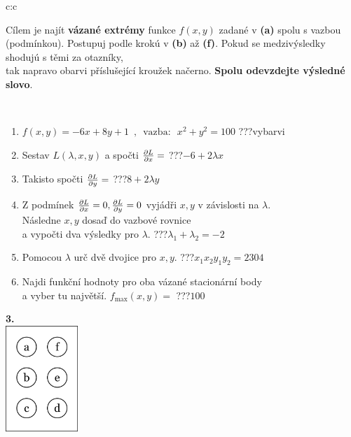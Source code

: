 \documentclass[10pt]{report}
\begin{document}
\begin{tabular}{c:c}
\begin{minipage}[c][104.5mm][t]{0.5\linewidth}
\begin{center}
\begin{minipage}{0.95\linewidth}
\begin{center}
Cílem je najít \textbf{vázané extrémy} funkce $f(x,y)$ zadané v \textbf{(a)} spolu s vazbou (podmínkou). Postupuj podle krokú v \textbf{(b)} až \textbf{(f)}. Pokud se medzivýsledky shodujú s těmi za otazníky,\\tak napravo obarvi příslušející kroužek načerno. \textbf{Spolu odevzdejte výsledné slovo}.
\end{center}
\end{minipage}
\\[1mm]
\begin{minipage}{0.79\linewidth}
\begin{center}
\begin{varwidth}{\linewidth}
\begin{enumerate}
\normalsize
\item $f(x,y)=-6x+8y+1 \enspace , \enspace \mathrm{vazba:} \enspace x^2+y^2=100$\quad \dotfill\; ???\;\dotfill \quad vybarvi
\item Sestav $L(\lambda,x,y)$ a spočti $\pdv{L}{x}=$\quad \dotfill\; ???\;\dotfill \quad $-6+2\lambda x$
\item Takisto spočti $\pdv{L}{y}=$\quad \dotfill\; ???\;\dotfill \quad $8+2\lambda y$
\item Z podmínek $\pdv{L}{x}=0 , \pdv{L}{y}=0$ vyjádři $x,y$ v závislosti na $\lambda$.\\ \phantom{xxxxxx}Následne $x,y$ dosaď do vazbové rovnice\\ \phantom{xxxxxx}a vypočti dva výsledky pro $\lambda$.\quad \dotfill\; ???\;\dotfill \quad $\lambda_1+\lambda_2=-2$
\item Pomocou $\lambda$ urč dvě dvojice pro $x,y$.\quad \dotfill\; ???\;\dotfill \quad $x_1 x_2 y_1 y_2=2304$
\item Najdi funkční hodnoty pro oba vázané stacionární body\\ \phantom{xxxxxx}a vyber tu najvětší. $f_{\text{max}}(x,y)=$\quad \dotfill\; ???\;\dotfill \quad $100$
\end{enumerate}
\end{varwidth}
\end{center}
\end{minipage}
\begin{minipage}{0.20\linewidth}
\begin{center}
{\Huge\bfseries 3.} \\[2mm]
\includegraphics[height=40mm]{../images/braille.png}

\end{center}
\end{minipage}
\end{center}
\end{minipage}
\end{tabular}
\end{document}
